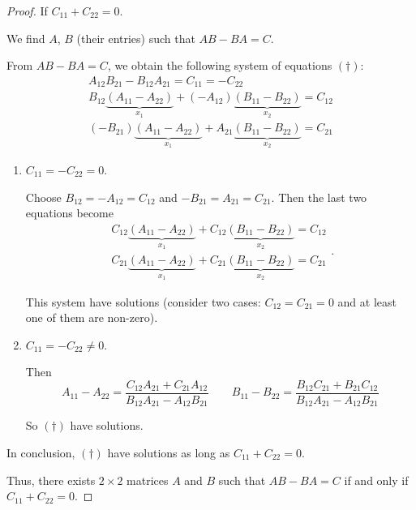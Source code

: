 \begin{proof}
    \hrulefill{}

    If $C_{11} + C_{22} = 0$.

    We find $A$, $B$ (their entries) such that $AB - BA = C$.

    From $AB - BA = C$, we obtain the following system of equations $(\dagger)$:
    \[
        \begin{split}
            A_{12}B_{21} - B_{12}A_{21} = C_{11} = -{C_{22}}                \\
            B_{12}\underbrace{(A_{11} - A_{22})}_{x_{1}} + (-{A_{12}})\underbrace{(B_{11} - B_{22})}_{x_{2}} = C_{12} \\
            (-{B_{21}})\underbrace{(A_{11} - A_{22})}_{x_{1}} + A_{21}\underbrace{(B_{11} - B_{22})}_{x_{2}} = C_{21}
        \end{split}
    \]

    \begin{enumerate}[label={\textbf{Case \arabic*.}},itemindent=1.2cm]
        \item $C_{11} = -{C_{22}} = 0$.

              Choose $B_{12} = -A_{12} = C_{12}$ and $-B_{21} = A_{21} = C_{21}$. Then the last two equations become
              \[
                  \begin{split}
                      C_{12}\underbrace{(A_{11} - A_{22})}_{x_{1}} + C_{12}\underbrace{(B_{11} - B_{22})}_{x_{2}} = C_{12} \\
                      C_{21}\underbrace{(A_{11} - A_{22})}_{x_{1}} + C_{21}\underbrace{(B_{11} - B_{22})}_{x_{2}} = C_{21}
                  \end{split}.
              \]

              This system have solutions (consider two cases: $C_{12} = C_{21} = 0$ and at least one of them are non-zero).
        \item $C_{11} = -{C_{22}} \ne 0$.

              Then
              \[
                  A_{11} - A_{22} = \dfrac{C_{12}A_{21} + C_{21}A_{12}}{B_{12}A_{21} - A_{12}B_{21}}
                  \qquad
                  B_{11} - B_{22} = \dfrac{B_{12}C_{21} + B_{21}C_{12}}{B_{12}A_{21} - A_{12}B_{21}}
              \]

              So $(\dagger)$ have solutions.
    \end{enumerate}

    In conclusion, $(\dagger)$ have solutions as long as $C_{11} + C_{22} = 0$.

    \hrulefill{}

    Thus, there exists $2\times 2$ matrices $A$ and $B$ such that $AB - BA = C$ if and only if $C_{11} + C_{22} = 0$.
\end{proof}

